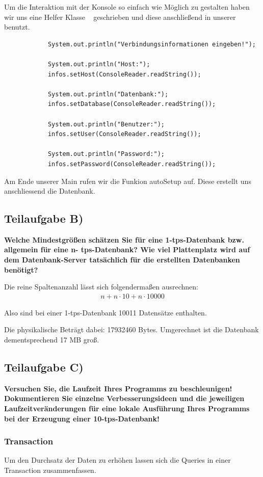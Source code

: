 Um die Interaktion mit der Konsole so einfach wie Möglich zu gestalten haben wir
uns eine Helfer Klasse ~ geschrieben und diese anschließend
in unserer  benutzt.
\clearpage

\begin{lstlisting}
			System.out.println("Verbindungsinformationen eingeben!");
			
			System.out.println("Host:");
			infos.setHost(ConsoleReader.readString());

			System.out.println("Datenbank:");
			infos.setDatabase(ConsoleReader.readString());
			
			System.out.println("Benutzer:");
			infos.setUser(ConsoleReader.readString());
			
			System.out.println("Password:");
			infos.setPassword(ConsoleReader.readString());
\end{lstlisting}

Am Ende unserer Main rufen wir die Funkion autoSetup auf. Diese erstellt uns
anschliessend die Datenbank.

\subsection{Teilaufgabe B)}
\textbf{Welche Mindestgrößen schätzen Sie für eine 1-tps-Datenbank bzw. allgemein für eine n-
tps-Datenbank? Wie viel Plattenplatz wird auf dem Datenbank-Server tatsächlich für die
erstellten Datenbanken benötigt?}

Die reine Spaltenanzahl lässt sich folgendermaßen ausrechnen:
\begin{eqnarray}
n + n \cdot 10 + n \cdot 10000
\end{eqnarray}

Also sind bei einer 1-tps-Datenbank 10011 Datensätze enthalten.

Die physikalische Beträgt dabei: 17932460 Bytes. \newline
Umgerechnet ist die Datenbank dementsprechend 17 MB groß.

\subsection{Teilaufgabe C)}
\textbf{Versuchen Sie, die Laufzeit Ihres Programms zu beschleunigen! Dokumentieren Sie
einzelne Verbesserungsideen und die jeweiligen Laufzeitveränderungen für eine lokale
Ausführung Ihres Programms bei der Erzeugung einer 10-tps-Datenbank!}

\subsubsection{Transaction}
Um den Durchsatz der Daten zu erhöhen lassen sich die Queries in einer
Transaction zusammenfassen.  

